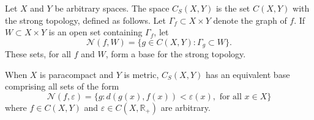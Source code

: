 Let $X$ and $Y$ be arbitrary spaces. The space $C_S(X, Y)$ is the set $C(X, Y)$ with the strong topology, defined as follows. Let $\Gamma_f \subset X \times Y$ denote the graph of $f$. If $W \subset X \times Y$ is an open set containing $\Gamma_f$, let
$$\mathcal{N}(f, W) = \{g \in C(X, Y): \Gamma_g \subset W\}.$$
These sets, for all $f$ and $W$, form a base for the strong topology.

When $X$ is paracompact and $Y$ is metric, $C_S(X, Y)$ has an equivalent base comprising all sets of the form
$$\mathcal{N}(f, \varepsilon) = \{g: d(g(x), f(x)) < \varepsilon(x), \text{ for all } x \in X\}$$
where $f \in C(X, Y)$ and $\varepsilon \in C(X, \mathbb{R}_+)$ are arbitrary.
